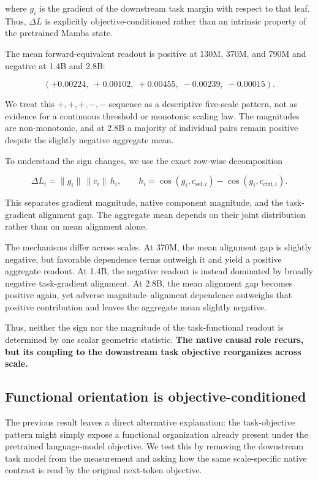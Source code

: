 \documentclass{article}
\begin{document}
where $g_i$ is the gradient of the downstream task margin with respect to that leaf. Thus, $\Delta L$ is explicitly objective-conditioned rather than an intrinsic property of the pretrained Mamba state.

The mean forward-equivalent readout is positive at 130M, 370M, and 790M and negative at 1.4B and 2.8B:

\[
(+0.00224,\;+0.00102,\;+0.00455,\;-0.00239,\;-0.00015).
\]

We treat this $+,+,+,-,-$ sequence as a descriptive five-scale pattern, not as evidence for a continuous threshold or monotonic scaling law. The magnitudes are non-monotonic, and at 2.8B a majority of individual pairs remain positive despite the slightly negative aggregate mean.

To understand the sign changes, we use the exact row-wise decomposition

\[
\Delta L_i
=
\|g_i\|\,\|c_i\|\,h_i,
\qquad
h_i=
\cos(g_i,c_{\mathrm{sel},i})
-
\cos(g_i,c_{\mathrm{ctrl},i}).
\]

This separates gradient magnitude, native component magnitude, and the task-gradient alignment gap. The aggregate mean depends on their joint distribution rather than on mean alignment alone.

The mechanisms differ across scales. At 370M, the mean alignment gap is slightly negative, but favorable dependence terms outweigh it and yield a positive aggregate readout. At 1.4B, the negative readout is instead dominated by broadly negative task-gradient alignment. At 2.8B, the mean alignment gap becomes positive again, yet adverse magnitude--alignment dependence outweighs that positive contribution and leaves the aggregate mean slightly negative.

Thus, neither the sign nor the magnitude of the task-functional readout is determined by one scalar geometric statistic. \textbf{The native causal role recurs, but its coupling to the downstream task objective reorganizes across scale.}

\subsection{Functional orientation is objective-conditioned}
\label{sec:objective}

The previous result leaves a direct alternative explanation: the task-objective pattern might simply expose a functional organization already present under the pretrained language-model objective. We test this by removing the downstream task model from the measurement and asking how the same scale-specific native contrast is read by the original next-token objective.
\end{document}
